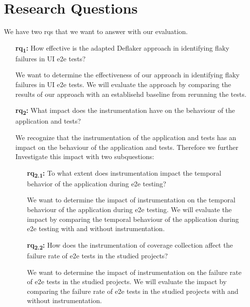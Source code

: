 \section{Research Questions}
We have two \acp{rq} that we want to answer with our evaluation.
\begin{enumerate}
	\item[\textbf{\ac{rq}\textsubscript{1}:}] How effective is the adapted Deflaker approach in identifying flaky failures in UI \ac{e2e} tests?

		We want to determine the effectiveness of our approach in identifying flaky failures in UI \ac{e2e} tests.
		We will evaluate the approach by comparing the results of our approach with an establisehd baseline from rerunning the tests.
	\item[\textbf{\ac{rq}\textsubscript{2}:}] What impact does the instrumentation have on the behaviour of the application and tests?

		We recognize that the instrumentation of the application and tests has an impact on the behaviour of the application and tests.
		Therefore we further Investigate this impact with two subquestions:
		\begin{enumerate}
			\item[\textbf{\ac{rq}\textsubscript{2.1}:}] To what extent does instrumentation impact the temporal behavior of the application during \ac{e2e} testing?

				We want to determine the impact of instrumentation on the temporal behaviour of the application during \ac{e2e} testing.
				We will evaluate the impact by comparing the temporal behaviour of the application during \ac{e2e} testing with and without instrumentation.
			\item[\textbf{\ac{rq}\textsubscript{2.2}:}] How does the instrumentation of coverage collection affect the failure rate of \ac{e2e} tests in the studied projects?

				We want to determine the impact of instrumentation on the failure rate of \ac{e2e} tests in the studied projects.
				We will evaluate the impact by comparing the failure rate of \ac{e2e} tests in the studied projects with and without instrumentation.
		\end{enumerate}
\end{enumerate}

